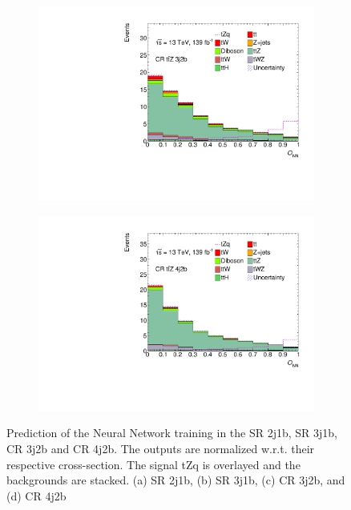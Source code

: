 \begin{figure}[ht]
\begin{subfigure}[b]{0.5\linewidth}
    \centering
    \includegraphics[width=\linewidth]{ubonn-thesis/Chapters/Chapters_06/Figure/Neural Network/CR_3j2b.pdf} 
     \vspace*{-0.9cm}
    \caption{} 
    \label{predict:CR3j2b} 
  \end{subfigure}%
  \begin{subfigure}[b]{0.5\linewidth}
    \centering
    \includegraphics[width=\linewidth]{ubonn-thesis/Chapters/Chapters_06/Figure/Neural Network/CR_4j2b.pdf} 
    \vspace*{-0.9cm}
    \caption{} 
    \label{predict:CR4j2b} 
  \end{subfigure} 
  \caption{Prediction of the Neural Network training in the SR 2j1b, SR 3j1b, CR 3j2b and CR 4j2b. The outputs are normalized w.r.t. their respective cross-section. The signal tZq is overlayed and the backgrounds are stacked. (a) SR 2j1b, (b) SR 3j1b, (c) CR 3j2b, and (d) CR 4j2b}
  \label{prediction:NN} 
\end{figure}


